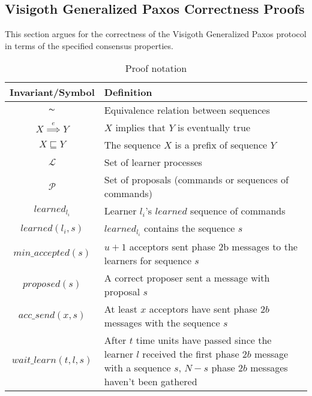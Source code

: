 \subsection{Visigoth Generalized Paxos Correctness Proofs}

This section argues for the correctness of the Visigoth Generalized Paxos protocol in terms of the specified consensus properties.\par


\begin{table}[h!]
	\renewcommand{\arraystretch}{1.5}
	\centering
	\begin{tabularx}{\linewidth}{ |c|X|}
		\hline
		Invariant/Symbol & Definition \\
		\hline
		$\thicksim$ & Equivalence relation between sequences \\
		\hline
		$X \overset{e}{\implies} Y$ & $X$ implies that $Y$ is eventually true \\
		\hline
		$X \sqsubseteq Y$ & The sequence $X$ is a prefix of sequence $Y$ \\
		\hline
		$\mathcal{L}$ & Set of learner processes \\
		\hline
		$\mathcal{P}$ & Set of proposals (commands or sequences of commands) \\
		\hline
		$learned_{l_i}$ & Learner $l_i$'s $learned$ sequence of commands \\
		\hline
		$learned(l_i,s)$ & $learned_{l_i}$ contains the sequence $s$ \\
		\hline
		$min\_accepted(s)$ & $u+1$ acceptors sent phase 2b messages to the learners for sequence $s$ \\
		\hline
		$proposed(s)$ & A correct proposer sent a message with proposal $s$ \\
		\hline
		$acc\_send(x,s)$ & At least $x$ acceptors have sent phase $2b$ messages with the sequence $s$ \\
		\hline
		$wait\_learn(t,l,s)$ & After $t$ time units have passed since the learner $l$ received the first phase $2b$ message with a sequence $s$, $N-s$ phase $2b$ messages haven't been gathered\\
		\hline
  	\end{tabularx} 
	\caption{Proof notation} 
	\label{table:vft_proof}
\end{table}

